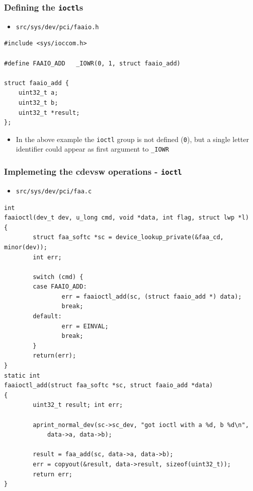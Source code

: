 \documentclass[dvipsnames,table]{beamer}
\begin{document}
\begin{frame}[fragile]
\frametitle{Defining the {\tt ioctl}s}
\begin{itemize}
\item {\tt src/sys/dev/pci/faaio.h}
\end{itemize}
\begin{lstlisting}
#include <sys/ioccom.h>
                     
#define FAAIO_ADD	_IOWR(0, 1, struct faaio_add)

struct faaio_add {
    uint32_t a;
    uint32_t b;
    uint32_t *result;
};
\end{lstlisting}
\begin{itemize}
	\item In the above example the {\tt ioctl} group is not defined ({\tt0}), but a single letter identifier could appear as first argument to {\tt\_IOWR}
\end{itemize}
\end{frame}

\begin{frame}[fragile]
\frametitle{Implemeting the cdevsw operations - {\tt ioctl}}
\begin{itemize}
	\item {\tt src/sys/dev/pci/faa.c}
\end{itemize}
\begin{lstlisting}
int
faaioctl(dev_t dev, u_long cmd, void *data, int flag, struct lwp *l)
{
        struct faa_softc *sc = device_lookup_private(&faa_cd, minor(dev));
        int err;

        switch (cmd) {
        case FAAIO_ADD:
                err = faaioctl_add(sc, (struct faaio_add *) data);
                break;
        default:
                err = EINVAL;
                break;
        }
        return(err);
}
static int
faaioctl_add(struct faa_softc *sc, struct faaio_add *data)
{
        uint32_t result; int err;

        aprint_normal_dev(sc->sc_dev, "got ioctl with a %d, b %d\n",
            data->a, data->b);

        result = faa_add(sc, data->a, data->b);
        err = copyout(&result, data->result, sizeof(uint32_t));
        return err;
}
\end{lstlisting}
\end{frame}
\end{document}
